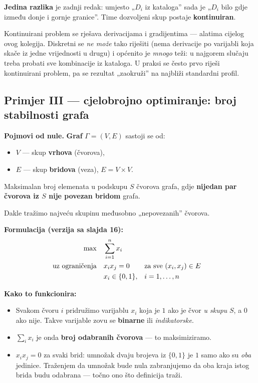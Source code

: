 \textbf{Jedina razlika} je zadnji redak: umjesto „$D_i$ iz kataloga” sada je
„$D_i$ bilo gdje između donje i gornje granice”. Time dozvoljeni skup postaje
\textbf{kontinuiran}.

\begin{napomena}
Kontinuirani problem se rješava derivacijama i gradijentima --- alatima cijelog
ovog kolegija. Diskretni se \emph{ne može} tako riješiti (nema derivacije po
varijabli koja skače iz jedne vrijednosti u drugu) i općenito je \emph{mnogo}
teži: u najgorem slučaju treba probati sve kombinacije iz kataloga. U praksi se
često prvo riješi kontinuirani problem, pa se rezultat „zaokruži” na najbliži
standardni profil.
\end{napomena}

\subsection{Primjer III --- cjelobrojno optimiranje: broj stabilnosti grafa}

\textbf{Pojmovi od nule.} \textbf{Graf} $\Gamma = (V, E)$ sastoji se od:
\begin{itemize}
  \item $V$ --- skup \textbf{vrhova} (čvorova),
  \item $E$ --- skup \textbf{bridova} (veza), $E = V \times V$.
\end{itemize}

\begin{definicija}
Maksimalan broj elemenata u podskupu $S$ čvorova grafa, gdje \textbf{nijedan par
čvorova iz $S$ nije povezan bridom} grafa.
\end{definicija}

Dakle tražimo najveću skupinu međusobno „nepovezanih” čvorova.

\textbf{Formulacija (verzija sa slajda 16):}
\begin{equation}
\begin{aligned}
\max \quad & \sum_{i=1}^{n} x_i \\
\uzogr & x_ix_j = 0 && \text{za sve } (x_i, x_j) \in E \\
& x_i \in \{0, 1\}, && i = 1,\dots,n
\end{aligned}
\end{equation}

\textbf{Kako to funkcionira:}
\begin{itemize}
  \item Svakom čvoru $i$ pridružimo varijablu $x_i$ koja je $1$ ako je čvor
        \emph{u skupu} $S$, a $0$ ako nije. Takve varijable zovu se
        \textbf{binarne} ili \emph{indikatorske}.
  \item $\sum_i x_i$ je onda \textbf{broj odabranih čvorova} --- to
        maksimiziramo.
  \item $x_ix_j = 0$ za svaki brid: umnožak dvaju brojeva iz $\{0,1\}$ je $1$
        samo ako su \emph{oba} jedinice. Traženjem da umnožak bude nula
        zabranjujemo da oba kraja istog brida budu odabrana --- točno ono što
        definicija traži.
\end{itemize}

